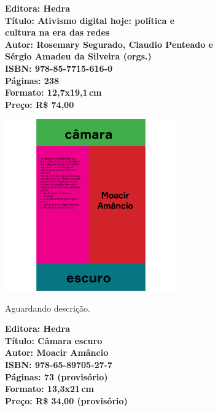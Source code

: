 \vfill
\noindent\begin{minipage}[c]{1\linewidth}
{\small\textbf{
\hspace*{-.1cm}Editora: Hedra\\
Título: Ativismo digital hoje: política e\\cultura na era das redes\\
Autor: Rosemary Segurado, Claudio Penteado e\\Sérgio Amadeu da Silveira (orgs.)\\ 
ISBN: 978-85-7715-616-0\\
Páginas: 238\\
Formato: 12,7x19,1\,cm\\
Preço: R\$ 74,00\\
}}
\end{minipage}
\pagebreak

\begin{center}
\hspace*{-3.6cm}
\hspace*{3.1cm}\includegraphics[width=74mm]{./CAPAS/HEDRA_CAMARA.jpg}
\end{center}
\hspace*{-7cm}\hrulefill\hspace*{-7cm}
\medskip

\noindent{}Aguardando descrição.

\vfill
\noindent\begin{minipage}[c]{1\linewidth}
{\small\textbf{
\hspace*{-.1cm}Editora: Hedra\\
Título: Câmara escuro\\
Autor: Moacir Amâncio\\ 
ISBN: 978-65-89705-27-7\\
Páginas: 73 (provisório)\\
Formato: 13,3x21\,cm\\
Preço: R\$ 34,00 (provisório)\\
}}
\end{minipage}
\pagebreak

